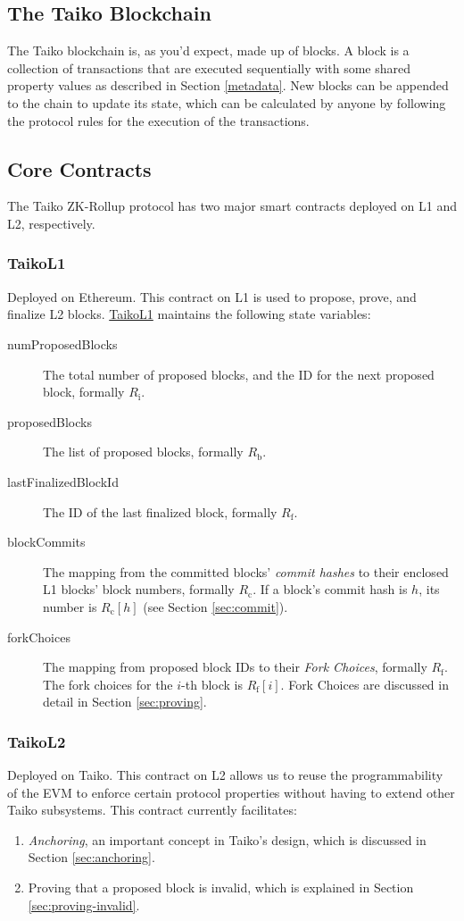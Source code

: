 \documentclass[9pt,oneside]{amsart}
\begin{document}
\begin{multicols}{2}
\section{The Taiko Blockchain}
The Taiko blockchain is, as you'd expect, made up of blocks. A block is a collection of transactions that are executed sequentially with some shared property values as described in Section \ref{metadata}. New blocks can be appended to the chain to update its state, which can be calculated by anyone by following the protocol rules for the execution of the transactions.

\subsection{Core Contracts}
The Taiko ZK-Rollup protocol has two major smart contracts deployed on L1 and L2, respectively.

\subsubsection{TaikoL1} Deployed on Ethereum. This contract on L1 is used to propose, prove, and finalize L2 blocks. \underline{TaikoL1} maintains the following state variables:

\begin{description}
\item[numProposedBlocks] The total number of proposed blocks, and the ID for the next proposed block, formally $R_\mathrm{i}$.
\item[proposedBlocks] The list of proposed blocks, formally $R_\mathrm{b}$.
\item[lastFinalizedBlockId] The ID of the last finalized block, formally $R_\mathrm{f}$.
\item [blockCommits] The mapping from the committed blocks' \emph{commit hashes} to their enclosed L1 blocks' block numbers, formally $R_\mathrm{c}$. If a block's commit hash is $h$, its number is $R_\mathrm{c}[h]$ (see Section \ref{sec:commit}).
\item[forkChoices] The mapping from proposed block IDs to their \emph{Fork Choices}, formally $R_\mathrm{f}$. The fork choices for the $i$-th block is $R_\mathrm{f}[i]$. Fork Choices are discussed in detail in Section \ref{sec:proving}.
\end{description}

\subsubsection{{TaikoL2}} Deployed on Taiko. This contract on L2 allows us to reuse the programmability of the EVM to enforce certain protocol properties without having to extend other Taiko subsystems. This contract currently facilitates:
\begin{enumerate}
\item \emph{Anchoring}, an important concept in Taiko's design, which is discussed in Section \ref{sec:anchoring}.
\item Proving that a proposed block is invalid, which is explained in Section \ref{sec:proving-invalid}.
\end{enumerate}


\end{multicols}
\end{document}
